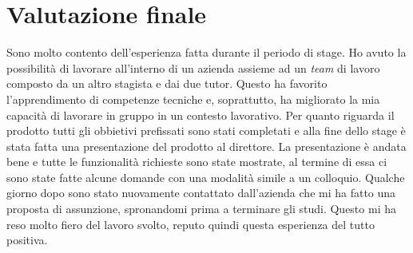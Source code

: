 \section{Valutazione finale}
Sono molto contento dell'esperienza fatta durante il periodo di stage. Ho avuto la possibilità di lavorare all'interno di un azienda assieme ad un \textit{team} di lavoro composto da un altro stagista e dai due tutor. Questo ha favorito l'apprendimento di competenze tecniche e, soprattutto, ha migliorato la mia capacità di lavorare in gruppo in un contesto lavorativo. Per quanto riguarda il prodotto tutti gli obbietivi prefissati sono stati completati e alla fine dello stage è stata fatta una presentazione del prodotto al direttore. La presentazione è andata bene e tutte le funzionalità richieste sono state mostrate, al termine di essa ci sono state fatte alcune domande con una modalità simile a un colloquio. Qualche giorno dopo sono stato nuovamente contattato dall'azienda che mi ha fatto una proposta di assunzione, spronandomi prima a terminare gli studi. Questo mi ha reso molto fiero del lavoro svolto, reputo quindi questa esperienza del tutto positiva.
